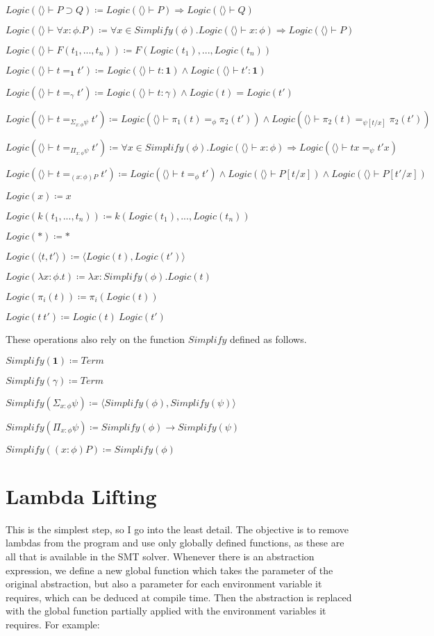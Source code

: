 \documentclass[12pt,a4paper,titlepage]{article}
\newcommand{\lnc}[1]{Logic(\langle \rangle \vdash #1)}
\begin{document}
    $\lnc{P \supset Q} \coloneqq \lnc{P} \Rightarrow \lnc{Q}$

    $\lnc{\forall x: \phi . P} \coloneqq \forall x \in Simplify(\phi) . \lnc{x: \phi} \Rightarrow \lnc{P}$

    $\lnc{F(t_1, ..., t_n)} \coloneqq F(Logic(t_1), ..., Logic(t_n))$

    $\lnc{t =_\textbf{1} t'} \coloneqq \lnc{t: \textbf{1}} \land \lnc{t': \textbf{1}}$

    $\lnc{t =_\gamma t'} \coloneqq \lnc{t: \gamma} \land Logic(t) = Logic(t')$

    $\lnc{t =_{\Sigma_{x: \phi} \psi} t'} \coloneqq
    \lnc{\pi_1 (t) =_\phi \pi_2 (t')} \land \lnc{\pi_2 (t) =_{\psi[t/x]} \pi_2 (t')}$

    $\lnc{t =_{\Pi_{x: \phi} \psi} t'} \coloneqq
    \forall x \in Simplify(\phi) . \lnc{x: \phi} \Rightarrow \lnc{tx =_\psi t'x}$

    $\lnc{t =_{(x: \phi)P} t'} \coloneqq \lnc{t =_\phi t'} \land \lnc{P[t/x]} \land \lnc{P[t'/x]}$

    $Logic(x) \coloneqq x$

    $Logic(k(t_1, ..., t_n)) \coloneqq k(Logic(t_1), ..., Logic(t_n))$

    $Logic(\ast) \coloneqq \ast$

    $Logic(\langle t, t' \rangle) \coloneqq \langle Logic(t), Logic(t') \rangle$

    $Logic(\lambda x: \phi . t) \coloneqq \lambda x: Simplify(\phi) . Logic(t)$

    $Logic(\pi_i (t)) \coloneqq \pi_i (Logic(t))$

    $Logic(t\ t') \coloneqq Logic(t)\ Logic(t')$

    These operations also rely on the function $Simplify$ defined as follows.

    $Simplify(\textbf{1}) \coloneqq Term$

    $Simplify(\gamma) \coloneqq Term$

    $Simplify(\Sigma_{x: \phi} \psi) \coloneqq \langle Simplify(\phi), Simplify(\psi) \rangle$

    $Simplify(\Pi_{x: \phi} \psi) \coloneqq Simplify(\phi) \rightarrow Simplify(\psi)$

    $Simplify((x: \phi)P) \coloneqq Simplify(\phi)$

    \section{Lambda Lifting}
    This is the simplest step, so I go into the least detail.
    The objective is to remove lambdas from the program and use only globally defined functions, as these are all
    that is available in the SMT solver.
    Whenever there is an abstraction expression, we define a new global function which takes the parameter of the
    original abstraction, but also a parameter for each environment variable it requires, which can be deduced at
    compile time.
    Then the abstraction is replaced with the global function partially applied with the environment variables it
    requires. For example:
\end{document}
